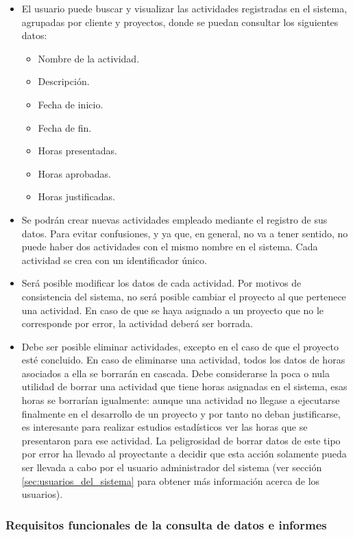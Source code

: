 \begin{itemize}
\item El usuario puede buscar y visualizar las actividades registradas en
el sistema, agrupadas por cliente y proyectos, donde se puedan consultar los
siguientes datos:
  \begin{itemize}
  \item Nombre de la actividad.
  \item Descripción.
  \item Fecha de inicio.
  \item Fecha de fin.
  \item Horas presentadas.
  \item Horas aprobadas.
  \item Horas justificadas.
  \end{itemize}

\item Se podrán crear nuevas actividades empleado mediante el registro de
sus datos. Para evitar confusiones, y ya que, en general, no va a tener sentido,
no puede haber dos actividades con el mismo nombre en el sistema. Cada actividad
se crea con un identificador único.

\item Será posible modificar los datos de cada actividad. Por motivos de
consistencia del sistema, no será posible cambiar el proyecto al que pertenece
una actividad. En caso de que se haya asignado a un proyecto que no le
corresponde por error, la actividad deberá ser borrada.

\item Debe ser posible eliminar actividades, excepto en el caso de que el
proyecto esté concluido. En caso de
eliminarse una actividad, todos los datos de horas asociados a ella se borrarán
en cascada. Debe considerarse la poca o nula utilidad de borrar una actividad
que tiene horas asignadas en el sistema, esas horas se borrarían igualmente:
aunque una actividad no llegase a ejecutarse finalmente en el
desarrollo de un proyecto y por tanto no deban justificarse, es
interesante para realizar estudios estadísticos ver las horas que se presentaron
para ese actividad. La peligrosidad de borrar datos de este tipo por error ha
llevado al proyectante a decidir que esta acción solamente pueda ser llevada a
cabo por el usuario administrador del sistema (ver sección
\ref{sec:usuarios_del_sistema} para obtener más información acerca de los
usuarios).
\end{itemize}

\subsubsection{Requisitos funcionales de la consulta de datos e informes}
\label{sec:requisitos_informes}

